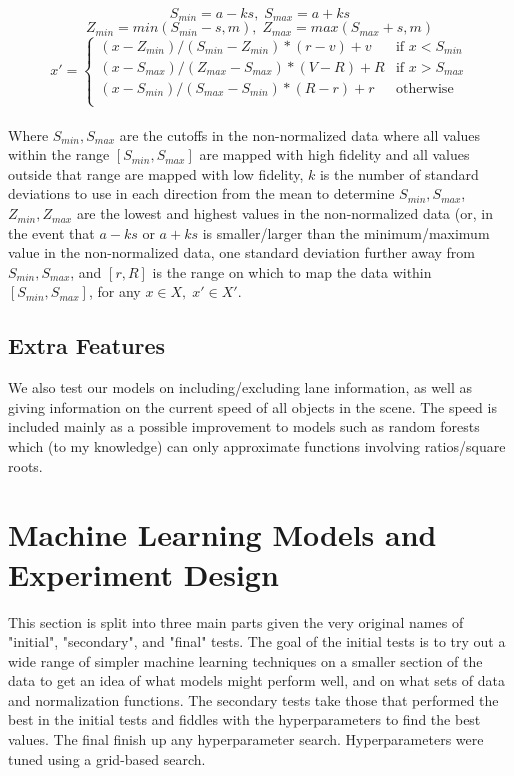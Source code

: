 \documentclass{article}
\begin{document}
$$ S_{min} = a - ks, \; S_{max} = a + ks $$
$$ Z_{min} = min(S_{min} - s, m), \; Z_{max} = max(S_{max} + s, m) $$
$$ x' = \begin{cases} 
    (x - Z_{min}) / (S_{min} - Z_{min}) * (r - v) + v &\mbox{if } x < S_{min} \\
    (x - S_{max}) / (Z_{max} - S_{max}) * (V - R) + R &\mbox{if } x > S_{max} \\
    (x - S_{min}) / (S_{max} - S_{min}) * (R - r) + r &\mbox{otherwise}\\
    \end{cases}$$
\\
Where $S_{min}, S_{max}$ are the cutoffs in the non-normalized data where all values within the range $[S_{min}, S_{max}]$ are mapped with high fidelity and all values outside that range are mapped with low fidelity, $k$ is the number of standard deviations to use in each direction from the mean to determine $S_{min}, S_{max}$, $Z_{min}, Z_{max}$ are the lowest and highest values in the non-normalized data (or, in the event that $a-ks$ or $a + ks$ is smaller/larger than the minimum/maximum value in the non-normalized data, one standard deviation further away from $S_{min}, S_{max}$, and $[r, R]$ is the range on which to map the data within $[S_{min}, S_{max}]$, for any $x \in X, \; x' \in X'$.

\subsection{Extra Features}

We also test our models on including/excluding lane information, as well as giving information on the current speed of all objects in the scene. The speed is included mainly as a possible improvement to models such as random forests which (to my knowledge) can only approximate functions involving ratios/square roots.

\section{Machine Learning Models and Experiment Design}

This section is split into three main parts given the very original names of "initial", "secondary", and "final" tests. The goal of the initial tests is to try out a wide range of simpler machine learning techniques on a smaller section of the data to get an idea of what models might perform well, and on what sets of data and normalization functions. The secondary tests take those that performed the best in the initial tests and fiddles with the hyperparameters to find the best values. The final finish up any hyperparameter search. Hyperparameters were tuned using a grid-based search.
\end{document}
